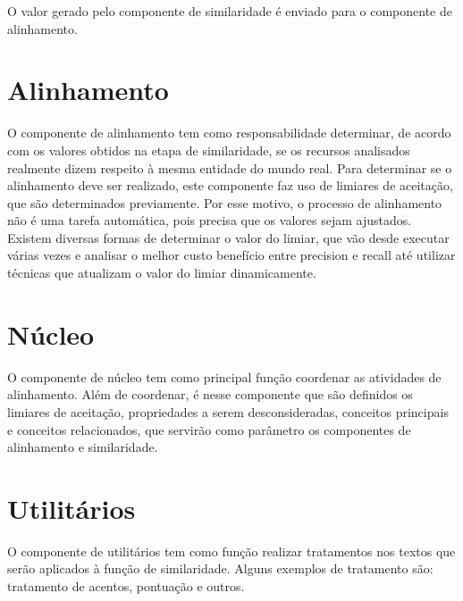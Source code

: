 O valor gerado pelo componente de similaridade é enviado para o componente de alinhamento.
\section{Alinhamento}
O componente de alinhamento tem como responsabilidade determinar, de acordo com os valores obtidos na etapa de similaridade, se os recursos analisados realmente dizem respeito à mesma entidade do mundo real. Para determinar se o alinhamento deve ser realizado, este componente faz uso de limiares de aceitação, que são determinados previamente. Por esse motivo, o processo de alinhamento não é uma tarefa automática, pois precisa que os valores sejam ajustados. Existem diversas formas de determinar o valor do limiar, que vão desde executar várias vezes e analisar o melhor custo benefício entre precision e recall até utilizar técnicas que atualizam o valor do limiar dinamicamente.


\section{Núcleo}
O componente de núcleo tem como principal função coordenar as atividades de alinhamento. Além de coordenar, é nesse componente que são definidos os limiares de aceitação, propriedades a serem desconsideradas, conceitos principais e conceitos relacionados, que servirão como parâmetro os componentes de alinhamento e similaridade.


\section{Utilitários}
O componente de utilitários tem como função realizar tratamentos nos textos que serão aplicados à função de similaridade. Alguns exemplos de tratamento são: tratamento de acentos, pontuação e outros.

